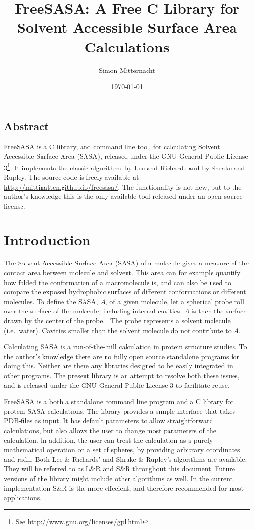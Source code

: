 \documentclass[a4paper,11pt]{article}
\author{Simon Mitternacht}
\date{\today}
\title{FreeSASA: A Free C Library for Solvent Accessible Surface
  Area Calculations
}
\begin{document}
\maketitle

\subsection*{Abstract}
FreeSASA is a C library, and command line tool, for calculating
Solvent Accessible Surface Area (SASA), released under the GNU General
Public License 3\footnote{See
  \url{http://www.gnu.org/licenses/gpl.html}}. It implements the
classic algorithms by Lee and Richards and by Shrake and Rupley. The
source code is freely available at
\url{http://mittinatten.github.io/freesasa/}. The functionality is not
new, but to the author's knowledge this is the only available tool
released under an open source license.

\section{Introduction}
The Solvent Accessible Surface Area (SASA) of a molecule gives a
measure of the contact area between molecule and solvent. This
area can for example quantify how folded the conformation of a
macromolecule is, and can also be used to compare the exposed
hydrophobic surfaces of different conformations or different
molecules. To define the SASA, $A$, of a given molecule, let a
spherical probe roll over the surface of the molecule, including
internal cavities. $A$ is then the surface drawn by the center of the
probe.~\cite{LnR} The probe represents a solvent molecule
(i.e.\ water). Cavities smaller than the solvent molecule do not
contribute to $A$.

Calculating SASA is a run-of-the-mill calculation in protein structure
studies. To the author's knowledge there are no fully open source
standalone programs for doing this. Neither are there any libraries
designed to be easily integrated in other programs. The present
library is an attempt to resolve both these issues, and is released
under the GNU General Public License 3 to facilitate reuse.

FreeSASA is a both a standalone command line program and a C library
for protein SASA calculations. The library provides a simple interface
that takes PDB-files as input. It has default parameters to allow
straightforward calculations, but also allows the user to change most
parameters of the calculation. In addition, the user can treat the
calculation as a purely mathematical operation on a set of spheres, by
providing arbitrary coordinates and radii. Both Lee \& Richards'
\cite{LnR} and Shrake \& Rupley's \cite{SnR} algorithms are
available. They will be referred to as L\&R and S\&R throughout this
document. Future versions of the library might include other
algorithms as well. In the current implementation S\&R is the more
effecient, and therefore recommended for most applications.
\end{document}
